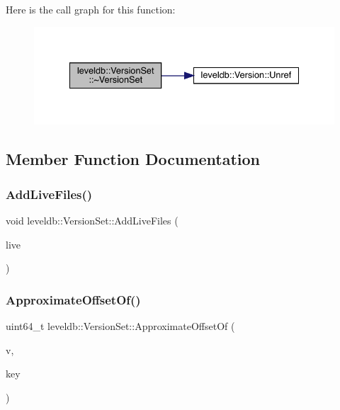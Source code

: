 Here is the call graph for this function\+:
\nopagebreak
\begin{figure}[H]
\begin{center}
\leavevmode
\includegraphics[width=334pt]{classleveldb_1_1_version_set_a53a424c5bb7699808193f150e3432e92_cgraph}
\end{center}
\end{figure}


\subsection{Member Function Documentation}
\mbox{\label{classleveldb_1_1_version_set_a3b3c810f0fea88db81b94e604b3dd78f}} 
\subsubsection{\texorpdfstring{AddLiveFiles()}{AddLiveFiles()}}
{\footnotesize\ttfamily void leveldb\+::\+Version\+Set\+::\+Add\+Live\+Files (\begin{DoxyParamCaption}\item[{std\+::set$<$ uint64\+\_\+t $>$ $\ast$}]{live }\end{DoxyParamCaption})}

\mbox{\label{classleveldb_1_1_version_set_ada7f3ed63b1c48adb6e5b38348b300e1}} 
\subsubsection{\texorpdfstring{ApproximateOffsetOf()}{ApproximateOffsetOf()}}
{\footnotesize\ttfamily uint64\+\_\+t leveldb\+::\+Version\+Set\+::\+Approximate\+Offset\+Of (\begin{DoxyParamCaption}\item[{\mbox{\hyperlink{classleveldb_1_1_version}{Version}} $\ast$}]{v,  }\item[{const \mbox{\hyperlink{classleveldb_1_1_internal_key}{Internal\+Key}} \&}]{key }\end{DoxyParamCaption})}

